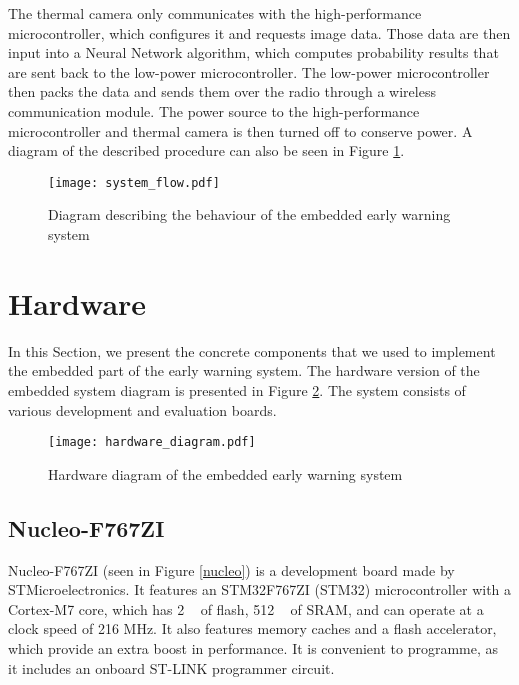 The thermal camera only communicates with the high-performance microcontroller, which configures it and requests image data.
Those data are then input into a Neural Network algorithm, which computes probability results that are sent back to the low-power microcontroller.
The low-power microcontroller then packs the data and sends them over the radio through a wireless communication module.
The power source to the high-performance microcontroller and thermal camera is then turned off to conserve power.
A diagram of the described procedure can also be seen in Figure \ref{system_flow}.
\newline
\begin{figure}[ht]
        \centering
        \texttt{[image: system\_flow.pdf]} 
        \caption{ Diagram describing the behaviour of the embedded early warning system} 
        \label{system_flow}
\end{figure}


\section{ Hardware}

In this Section, we present the concrete components that we used to implement the embedded part of the early warning system.
The hardware version of the embedded system diagram is presented in Figure \ref{hardware_diagram}.
The system consists of various development and evaluation boards.

\begin{figure}[ht]
        \centering
        \texttt{[image: hardware\_diagram.pdf]} 
        \caption{ Hardware diagram of the embedded early warning system} 
        \label{hardware_diagram}
\end{figure}


\subsection{ Nucleo-F767ZI}

Nucleo-F767ZI (seen in Figure \ref{nucleo}) is a development board made by STMicroelectronics.
It features an STM32F767ZI (STM32) microcontroller with a Cortex-M7 core, which has 2 \si{\mega\byte} of flash, 512 \si{\kilo\byte} of SRAM, and can operate at a clock speed of 216 \si{\mega\hertz}.
It also features memory caches and a flash accelerator, which provide an extra boost in performance.
It is convenient to programme, as it includes an onboard ST-LINK programmer circuit.

